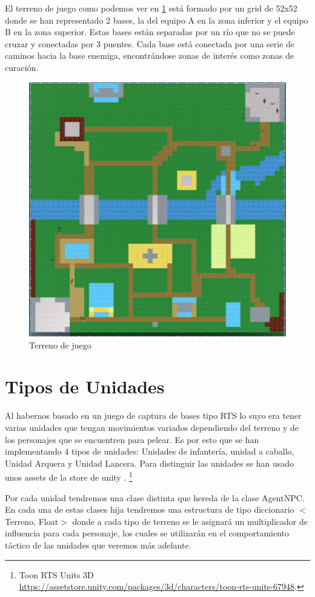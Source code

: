 El terreno de juego como podemos ver en \ref{fig:mapa} está formado por un grid de 52x52 donde se han representado 2 bases, la del equipo A en la zona inferior y el equipo B en la zona superior. Estas bases están separadas por un río que no se puede cruzar y conectadas por 3 puentes. Cada base está conectada por una serie de caminos hacia la base enemiga, encontrándose zonas de interés como zonas de curación.
 \begin{figure}[H]
    \centering
    \includegraphics[scale=0.7]{doc/images/Mapa.png}
    \caption{Terreno de juego}
    \label{fig:mapa}
\end{figure}
\section{Tipos de Unidades}
Al habernos basado en un juego de captura de bases tipo RTS lo suyo era tener varias unidades que tengan movimientos variados dependiendo del terreno y de los personajes que se encuentren para pelear. Es por esto que se han implementando 4 tipos de unidades:
Unidades de infantería, unidad a caballo, Unidad Arquera y Unidad Lancera. Para distinguir las unidades se han usado unos assets de la store de unity .
\footnote{Toon RTS Units 3D \url{https://assetstore.unity.com/packages/3d/characters/toon-rts-units-67948}.}

Por cada unidad tendremos una clase distinta que hereda de la clase AgentNPC. En cada una de estas clases hija tendremos una estructura de tipo diccionario $<$Terreno, Float$>$ donde a cada tipo de terreno se le asignará un multiplicador de influencia para cada personaje, los cuales se utilizarán en el comportamiento táctico de las unidades que veremos más adelante.\\

